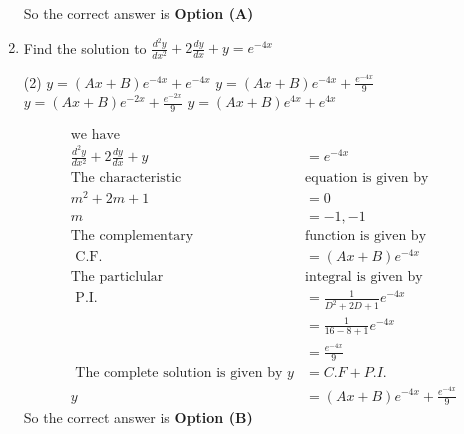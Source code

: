 \begin{enumerate}[label=\color{ocre}\textbf{\arabic*.}]
\begin{answer}
$$	$$
	So the correct answer is \textbf{Option (A)}
\end{answer}
\item Find the solution to $\frac{d^{2} y}{d x^{2}}+2 \frac{d y}{d x}+y=e^{-4 x}$
\begin{tasks}(2)
	\task[\textbf{a.}]$y=(A x+B) e^{-4 x}+e^{-4 x}$
	\task[\textbf{b.}]$y=(A x+B) e^{-4 x}+\frac{e^{-4 x}}{9}$
	\task[\textbf{c.}]$y=(A x+B) e^{-2 x}+\frac{e^{-2 x}}{9}$
	\task[\textbf{d.}]$y=(A x+B) e^{4 x}+e^{4 x}$ 
\end{tasks}
\begin{answer}
	$$
	\begin{aligned}
	\text{we have}&\\
	\frac{d^{2} y}{d x^{2}}+2 \frac{d y}{d x}+y&=e^{-4 x}\\
	\text{The characteristic }&\text{equation is given by}\\
	m^{2}+2 m+1&=0 \\ m&=-1,-1\\
	\text{The complementary }&\text{function is given by}\\
	\text { C.F. }&=(A x+B) e^{-4 x}\\
	\text{The particlular }&\text{integral is given by}\\
	\text { P.I. }&=\frac{1}{D^{2}+2 D+1} e^{-4 x}\\&=\frac{1}{16-8+1} e^{-4 x}\\&=\frac{e^{-4 x}}{9}\\
	\text{ The complete solution is given by }y&=C.F+P.I.\\
	y&=(A x+B) e^{-4 x}+\frac{e^{-4 x}}{9}
	\end{aligned}
	$$
	So the correct answer is \textbf{Option (B)}
\end{answer}



\end{enumerate}